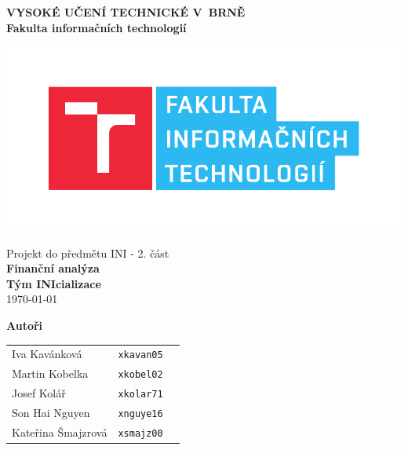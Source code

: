 \begin{titlepage}

    \centering

    {\fontsize{20pt}{15pt}\bfseries
    VYSOKÉ UČENÍ TECHNICKÉ V~BRNĚ\\
    \vspace{8pt}
    Fakulta informačních technologií
    }


    \includegraphics[scale=0.7]{./assets/fit-logo.pdf}

    \vspace{22pt}

    {\Large Projekt do předmětu INI - 2. část\\}
    \vspace{4pt}
    {\LARGE \bfseries Finanční analýza\\}
    \vspace{90pt}
    {\Large \bfseries Tým INIcializace\\}
    \vspace{90pt}
    {\Large \today}

    \vspace{90pt}
    {\Large \bfseries Autoři\\}
    \vspace{12pt}

    \begin{tabular}{ l c r }
        Iva Kavánková & \texttt{xkavan05} \\
        Martin Kobelka & \texttt{xkobel02} \\
        Josef Kolář & \texttt{xkolar71} \\
        Son Hai Nguyen & \texttt{xnguye16} \\
        Kateřina Šmajzrová & \texttt{xsmajz00} \\
    \end{tabular}\\

\end{titlepage}